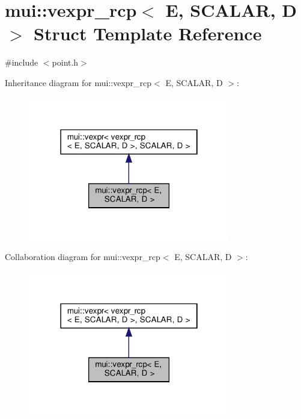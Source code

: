 \hypertarget{structmui_1_1vexpr__rcp}{}\section{mui\+:\+:vexpr\+\_\+rcp$<$ E, S\+C\+A\+L\+AR, D $>$ Struct Template Reference}
\label{structmui_1_1vexpr__rcp}


{\ttfamily \#include $<$point.\+h$>$}



Inheritance diagram for mui\+:\+:vexpr\+\_\+rcp$<$ E, S\+C\+A\+L\+AR, D $>$\+:
\nopagebreak
\begin{figure}[H]
\begin{center}
\leavevmode
\includegraphics[width=250pt]{structmui_1_1vexpr__rcp__inherit__graph}
\end{center}
\end{figure}


Collaboration diagram for mui\+:\+:vexpr\+\_\+rcp$<$ E, S\+C\+A\+L\+AR, D $>$\+:
\nopagebreak
\begin{figure}[H]
\begin{center}
\leavevmode
\includegraphics[width=250pt]{structmui_1_1vexpr__rcp__coll__graph}
\end{center}
\end{figure}
